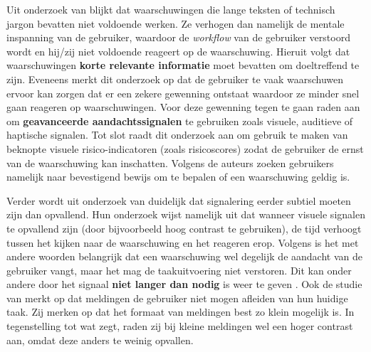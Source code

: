 Uit onderzoek van \textcite{Baltuttis2024} blijkt dat waarschuwingen die lange teksten of technisch jargon bevatten niet voldoende werken. Ze verhogen dan namelijk de mentale inspanning van de gebruiker, waardoor de \textit{workflow} van de gebruiker verstoord wordt en hij/zij niet voldoende reageert op de waarschuwing. Hieruit volgt dat waarschuwingen \textbf{korte relevante informatie} moet bevatten om doeltreffend te zijn. Eveneens merkt dit onderzoek op dat de gebruiker te vaak waarschuwen ervoor kan zorgen dat er een zekere gewenning ontstaat waardoor ze minder snel gaan reageren op waarschuwingen. Voor deze gewenning tegen te gaan raden \textcite{Baltuttis2024} aan om \textbf{geavanceerde aandachtssignalen} te gebruiken zoals visuele, auditieve of haptische signalen. Tot slot raadt dit onderzoek aan om gebruik te maken van beknopte visuele risico-indicatoren (zoals risicoscores) zodat de gebruiker de ernst van de waarschuwing kan inschatten. Volgens de auteurs zoeken gebruikers namelijk naar bevestigend bewijs om te bepalen of een waarschuwing geldig is.

\vspace{1em}

Verder wordt uit onderzoek van \textcite{Einhaeuser2024} duidelijk dat signalering eerder subtiel moeten zijn dan opvallend. Hun onderzoek wijst namelijk uit dat wanneer visuele signalen te opvallend zijn (door bijvoorbeeld hoog contrast te gebruiken), de tijd verhoogt tussen het kijken naar de waarschuwing en het reageren erop. Volgens \textcite{Einhaeuser2024} is het met andere woorden belangrijk dat een waarschuwing wel degelijk de aandacht van de gebruiker vangt, maar het mag de taakuitvoering niet verstoren. Dit kan onder andere door het signaal \textbf{niet langer dan nodig} is weer te geven \autocite{Einhaeuser2024}. Ook de studie van \textcite{Hueber2023} merkt op dat meldingen de gebruiker niet mogen afleiden van hun huidige taak. Zij merken op dat het formaat van meldingen best zo klein mogelijk is. In tegenstelling tot wat \textcite{Einhaeuser2024} zegt, raden zij bij kleine meldingen wel een hoger contrast aan, omdat deze anders te weinig opvallen.

\vspace{1em}

